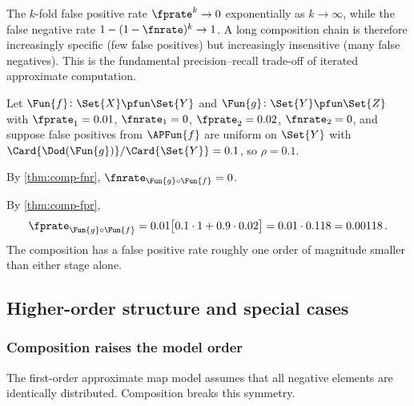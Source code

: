 \documentclass[ ../main.tex]{subfiles}
\begin{document}
\begin{remark}
The $k$-fold false positive rate $\fprate^k \to 0$ exponentially as
$k \to \infty$, while the false negative rate
$1-(1-\fnrate)^k \to 1$.  A long composition chain is therefore
increasingly specific (few false positives) but increasingly
insensitive (many false negatives).  This is the fundamental
precision--recall trade-off of iterated approximate computation.
\end{remark}

\begin{example}
\label{ex:two-stage}
Let $\Fun{f} \colon \Set{X} \pfun \Set{Y}$ and
$\Fun{g} \colon \Set{Y} \pfun \Set{Z}$ with
$\fprate_1 = 0.01$, $\fnrate_1 = 0$,
$\fprate_2 = 0.02$, $\fnrate_2 = 0$,
and suppose false positives from $\APFun{f}$ are uniform on $\Set{Y}$
with $\Card{\Dod(\Fun{g})}/\Card{\Set{Y}} = 0.1$,
so $\rho = 0.1$.

By \cref{thm:comp-fnr},
$\fnrate_{\Fun{g} \circ \Fun{f}} = 0$.

By \cref{thm:comp-fpr},
\begin{equation*}
\fprate_{\Fun{g} \circ \Fun{f}}
  = 0.01 \bigl[0.1 \cdot 1 + 0.9 \cdot 0.02\bigr]
  = 0.01 \cdot 0.118
  = 0.00118\,.
\end{equation*}
The composition has a false positive rate roughly one order of
magnitude smaller than either stage alone.
\end{example}

\subsection{Higher-order structure and special cases}
\label{sec:higher-order-comp}

\subsubsection{Composition raises the model order}

The first-order approximate map model assumes that all negative
elements are identically distributed.
Composition breaks this symmetry.
\end{document}
